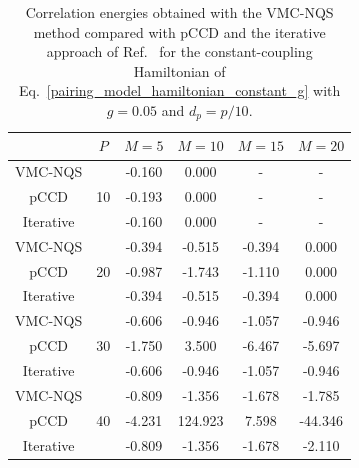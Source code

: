 \documentclass[aps,pre,floatfix,showpacs,twocolumn, preprintnumbers]{revtex4-1}
\begin{document}
\begin{table}[b]
\begin{center}
\vspace{0.5cm}
\begin{tabular}{ c | c | c c c c }
\hline
\hline
& $P$ & $M=5$  & $M=10$ & $M=15$ & $M=20$ \\
\hline
VMC-NQS & \multirow{3}{*}{ 10 }  & -0.160 & 0.000 & - & - \\
pCCD &  & -0.193 & 0.000 & - &  -\\
Iterative &  & -0.160  & 0.000 & - & - \\
\hline
VMC-NQS & \multirow{3}{*}{ 20 }  & -0.394 & -0.515 & -0.394 & 0.000 \\
pCCD &   & -0.987 & -1.743 & -1.110 &  0.000 \\
Iterative &   & -0.394 & -0.515 & -0.394 &  0.000 \\
\hline
VMC-NQS & \multirow{3}{*}{ 30 }  & -0.606 & -0.946 & -1.057 & -0.946 \\
pCCD &   & -1.750 & 3.500 & -6.467 &  -5.697\\
Iterative &   & -0.606 & -0.946 & -1.057 & -0.946\\
\hline
VMC-NQS & \multirow{3}{*}{ 40 }  & -0.809 & -1.356 & -1.678 & -1.785 \\
pCCD &   & -4.231 & 124.923 & 7.598 &  -44.346 \\
Iterative &   & -0.809 & -1.356 & -1.678 & -2.110\\
\hline
\end{tabular}
\caption{Correlation energies obtained with the VMC-NQS method compared with pCCD and the iterative approach of Ref.~\cite{Guan:2022CoPhC} for the constant-coupling Hamiltonian of Eq.~\eqref{pairing_model_hamiltonian_constant_g} with $g = 0.05$ and $d_p=p/10$.}
\label{tab:g_constant_large}
\end{center}
\end{table}
%
\end{document}
